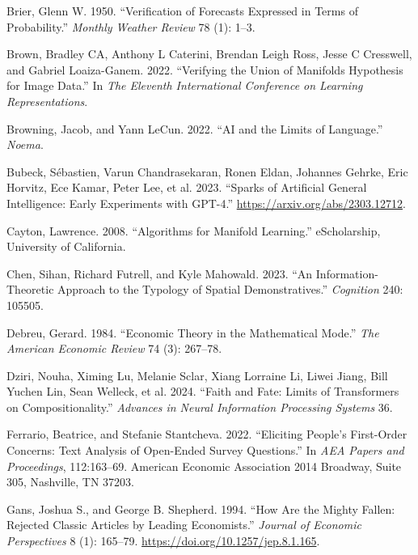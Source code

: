 \documentclass[
]{article}
\newlength{\cslhangindent}
\newenvironment{CSLReferences}[2] %
 {\begin{list}{}{%
  \setlength{\itemindent}{0pt}
  \setlength{\leftmargin}{0pt}
  \setlength{\parsep}{0pt}
  \ifodd #1
   \setlength{\leftmargin}{\cslhangindent}
   \setlength{\itemindent}{-1\cslhangindent}
  \fi
  \setlength{\itemsep}{#2\baselineskip}}}
 {\end{list}}
\begin{document}
\begin{CSLReferences}{1}{0}
Brier, Glenn W. 1950. {``Verification of Forecasts Expressed in Terms of
Probability.''} \emph{Monthly Weather Review} 78 (1): 1--3.

Brown, Bradley CA, Anthony L Caterini, Brendan Leigh Ross, Jesse C
Cresswell, and Gabriel Loaiza-Ganem. 2022. {``Verifying the Union of
Manifolds Hypothesis for Image Data.''} In \emph{The Eleventh
International Conference on Learning Representations}.

Browning, Jacob, and Yann LeCun. 2022. {``AI and the Limits of
Language.''} \emph{Noema}.

Bubeck, Sébastien, Varun Chandrasekaran, Ronen Eldan, Johannes Gehrke,
Eric Horvitz, Ece Kamar, Peter Lee, et al. 2023. {``Sparks of Artificial
General Intelligence: Early Experiments with GPT-4.''}
\url{https://arxiv.org/abs/2303.12712}.

Cayton, Lawrence. 2008. {``Algorithms for Manifold Learning.''}
eScholarship, University of California.

Chen, Sihan, Richard Futrell, and Kyle Mahowald. 2023. {``An
Information-Theoretic Approach to the Typology of Spatial
Demonstratives.''} \emph{Cognition} 240: 105505.

Debreu, Gerard. 1984. {``Economic Theory in the Mathematical Mode.''}
\emph{The American Economic Review} 74 (3): 267--78.

Dziri, Nouha, Ximing Lu, Melanie Sclar, Xiang Lorraine Li, Liwei Jiang,
Bill Yuchen Lin, Sean Welleck, et al. 2024. {``Faith and Fate: Limits of
Transformers on Compositionality.''} \emph{Advances in Neural
Information Processing Systems} 36.

Ferrario, Beatrice, and Stefanie Stantcheva. 2022. {``Eliciting People's
First-Order Concerns: Text Analysis of Open-Ended Survey Questions.''}
In \emph{AEA Papers and Proceedings}, 112:163--69. American Economic
Association 2014 Broadway, Suite 305, Nashville, TN 37203.

Gans, Joshua S., and George B. Shepherd. 1994. {``How Are the Mighty
Fallen: Rejected Classic Articles by Leading Economists.''}
\emph{Journal of Economic Perspectives} 8 (1): 165--79.
\url{https://doi.org/10.1257/jep.8.1.165}.


\end{CSLReferences}
\end{document}
